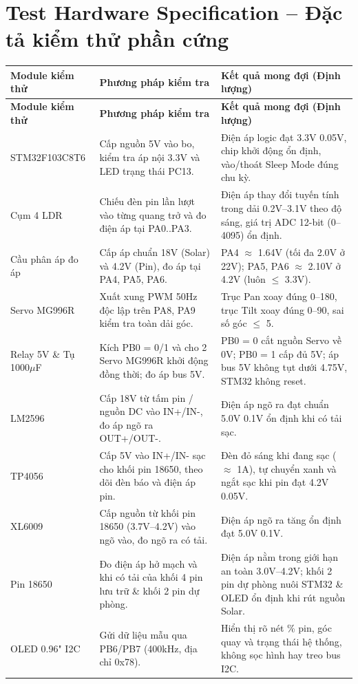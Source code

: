 \documentclass[12pt,a4paper]{report}
\begin{document}
\section{Test Hardware Specification -- Đặc tả kiểm thử phần cứng}

{
\small
\setlength{\LTleft}{0pt}\setlength{\LTright}{0pt}
\begin{longtable}{>{\raggedright\arraybackslash}p{}>{\raggedright\arraybackslash}p{}>{\raggedright\arraybackslash}p{}}
\toprule
\textbf{Module kiểm thử} & \textbf{Phương pháp kiểm tra} & \textbf{Kết quả mong đợi (Định lượng)} \\
\midrule
\endfirsthead
\toprule
\textbf{Module kiểm thử} & \textbf{Phương pháp kiểm tra} & \textbf{Kết quả mong đợi (Định lượng)} \\
\midrule
\endhead
\bottomrule
\endfoot
\bottomrule
\endlastfoot
STM32F103C8T6 & Cấp nguồn 5V vào bo, kiểm tra áp nội 3.3V và LED trạng thái PC13. & Điện áp logic đạt 3.3V \textpm{} 0.05V, chip khởi động ổn định, vào/thoát Sleep Mode đúng chu kỳ. \\
Cụm 4 LDR & Chiếu đèn pin lần lượt vào từng quang trở và đo điện áp tại PA0..PA3. & Điện áp thay đổi tuyến tính trong dải 0.2V--3.1V theo độ sáng, giá trị ADC 12-bit (0--4095) ổn định. \\
Cầu phân áp đo áp & Cấp áp chuẩn 18V (Solar) và 4.2V (Pin), đo áp tại PA4, PA5, PA6. & PA4 \ensuremath{\approx} 1.64V (tối đa 2.0V ở 22V); PA5, PA6 \ensuremath{\approx} 2.10V ở 4.2V (luôn \ensuremath{\le} 3.3V). \\
2 Servo MG996R & Xuất xung PWM 50Hz độc lập trên PA8, PA9 kiểm tra toàn dải góc. & Trục Pan xoay đúng 0\textdegree{}--180\textdegree{}, trục Tilt xoay đúng 0\textdegree{}--90\textdegree{}, sai số góc \ensuremath{\le} \textpm{}5\textdegree{}. \\
Relay 5V \& Tụ 1000\ensuremath{\mu}F & Kích PB0 = 0/1 và cho 2 Servo MG996R khởi động đồng thời; đo áp bus 5V. & PB0 = 0 cắt nguồn Servo về 0V; PB0 = 1 cấp đủ 5V; áp bus 5V không tụt dưới 4.75V, STM32 không reset. \\
LM2596 & Cấp 18V từ tấm pin / nguồn DC vào IN+/IN-, đo áp ngõ ra OUT+/OUT-. & Điện áp ngõ ra đạt chuẩn 5.0V \textpm{} 0.1V ổn định khi có tải sạc. \\
TP4056 & Cấp 5V vào IN+/IN- sạc cho khối pin 18650, theo dõi đèn báo và điện áp pin. & Đèn đỏ sáng khi đang sạc (\ensuremath{\approx} 1A), tự chuyển xanh và ngắt sạc khi pin đạt 4.2V \textpm{} 0.05V. \\
XL6009 & Cấp nguồn từ khối pin 18650 (3.7V--4.2V) vào ngõ vào, đo ngõ ra có tải. & Điện áp ngõ ra tăng ổn định đạt 5.0V \textpm{} 0.1V. \\
Pin 18650 & Đo điện áp hở mạch và khi có tải của khối 4 pin lưu trữ \& khối 2 pin dự phòng. & Điện áp nằm trong giới hạn an toàn 3.0V--4.2V; khối 2 pin dự phòng nuôi STM32 \& OLED ổn định khi rút nguồn Solar. \\
OLED 0.96" I2C & Gửi dữ liệu mẫu qua PB6/PB7 (400kHz, địa chỉ 0x78). & Hiển thị rõ nét \% pin, góc quay và trạng thái hệ thống, không sọc hình hay treo bus I2C. \\
\end{longtable}
}
\end{document}
